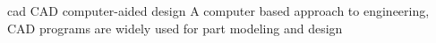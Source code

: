 \newglsXacronym%
{cad}%
{CAD}%
{computer{\--}aided design}%
{A computer based approach to engineering, CAD programs are widely used for part modeling and design}%